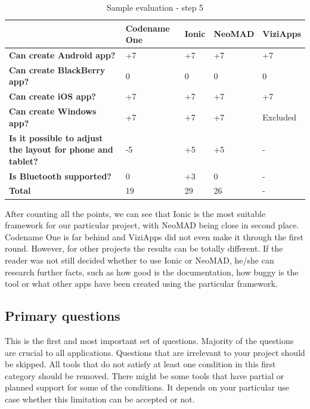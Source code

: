\documentclass[english,master,public,dept460,male,cpdeclaration,oneside]{diploma}
\begin{document}
\begin{table}[!h]
	\centering
	\caption{Sample evaluation - step 5}
	\begin{tabular}{p{2.5cm} | p{2.5cm} | p{2.5cm} | p{2.5cm} | p{2.5cm}}
		\toprule
		& \textbf{Codename One} & \textbf{Ionic} & \textbf{NeoMAD} & \textbf{ViziApps} \\
		\midrule
		\textbf{Can create Android app?} & +7 & +7 & +7 & +7 \\
		\textbf{Can create BlackBerry app?} & 0 & 0 & 0 & 0 \\
		\textbf{Can create iOS app?} & +7 & +7 & +7 & +7 \\
		\textbf{Can create Windows app?} & +7 & +7 & +7 & Excluded \\
		\midrule
		\textbf{Is it possible to adjust the layout for phone and tablet?} & -5 & +5 & +5 & - \\
		\midrule
		\textbf{Is Bluetooth supported?} & 0 & +3 & 0 & - \\
		\midrule
		\textbf{Total} & 19 & 29 & 26 & - \\
		\midrule
	\end{tabular}
\end{table}

After counting all the points, we can see that Ionic is the most suitable framework for our particular project, with NeoMAD being close in second place. Codename One is far behind and ViziApps did not even make it through the first round. However, for other projects the results can be totally different. If the reader was not still decided whether to use Ionic or NeoMAD, he/she can research further facts, such as how good is the documentation, how buggy is the tool or what other apps have been created using the particular framework.

\subsection{Primary questions}
This is the first and most important set of questions. Majority of the questions are crucial to all applications. Questions that are irrelevant to your project should be skipped. All tools that do not satisfy at least one condition in this first category should be removed. There might be some tools that have partial or planned support for some of the conditions. It depends on your particular use case whether this limitation can be accepted or not. 
\end{document}
